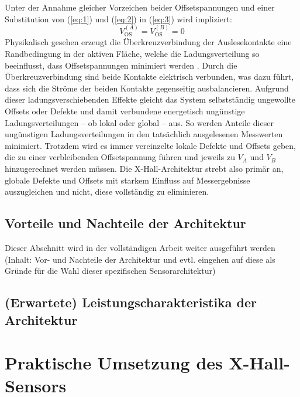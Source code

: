 \documentclass[12pt, a4paper]{article}
\begin{document}
		Unter der Annahme gleicher Vorzeichen beider Offsetspannungen und einer Substitution von (\ref{eq:1}) und (\ref{eq:2}) in (\ref{eq:3}) wird  impliziert:
		\begin{equation}
			V_\mathrm{OS}^{(A)}=V_\mathrm{OS}^{(B)}=0
			\label{eq:4}
		\end{equation}
		Physikalisch gesehen erzeugt die Überkreuzverbindung der Auslesekontakte eine  Randbedingung in der aktiven Fläche, welche die Ladungsverteilung so beeinflusst, dass Offsetspannungen minimiert werden \cite{cres21}. 
		Durch die Überkreuzverbindung sind beide Kontakte elektrisch verbunden, was dazu führt, dass sich die Ströme der beiden Kontakte gegenseitig ausbalancieren. %
		Aufgrund dieser ladungsverschiebenden Effekte gleicht das System selbstständig ungewollte Offsets oder Defekte und damit verbundene energetisch ungünstige Ladungsverteilungen – ob lokal oder global – aus. %
		So werden Anteile dieser ungünstigen Ladungsverteilungen in den tatsächlich ausgelesenen Messwerten minimiert.\newline
		Trotzdem wird es immer vereinzelte lokale Defekte und Offsets geben, die zu einer verbleibenden Offsetspannung führen und jeweils zu $V_A$ und $V_B$ hinzugerechnet werden müssen. Die X-Hall-Architektur strebt also primär an, globale Defekte und Offsets mit starkem Einfluss auf Messergebnisse auszugleichen und nicht, diese vollständig zu eliminieren\cite{cres21}.
		
		\subsection{Vorteile und Nachteile der Architektur}
			\centering
		Dieser Abschnitt wird in der vollständigen Arbeit weiter ausgeführt werden (Inhalt: Vor- und Nachteile der Architektur und evtl. eingehen auf diese als Gründe für die Wahl dieser spezifischen Sensorarchitektur)
		
		\subsection{(Erwartete) Leistungscharakteristika der Architektur}
		
		
	\section{Praktische Umsetzung des X-Hall-Sensors}
\end{document}

